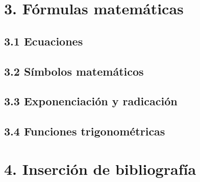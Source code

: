 \documentclass[legalpaper]{article}
\begin{document}
        

    \section*{3. F\'ormulas matem\'aticas}

        \subsection*{3.1 Ecuaciones}
        \subsection*{3.2 S\'imbolos matem\'aticos}
        \subsection*{3.3 Exponenciaci\'on y radicaci\'on}
        \subsection*{3.4 Funciones trigonom\'etricas}

    \section*{4. Inserci\'on de bibliograf\'ia}
\end{document}
